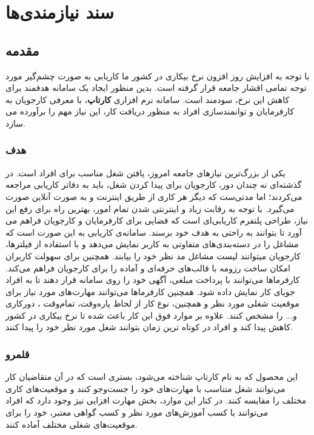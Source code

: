 \documentclass[12pt,svgnames,oneside]{book}
\begin{document}
\renewcommand{\bibname}{مراجع}

\frontmatter
\tableofcontents
\mainmatter

\chapter{سند نیازمندی‌ها}

\section{مقدمه}	
با توجه به افزایش روز افزون نرخ بیکاری در کشور ما کاریابی به صورت چشم‌گیر مورد توجه تمامی اقشار جامعه قرار گرفته است. بدین منظور ایجاد یک سامانه هدفمند برای کاهش این نرخ، سودمند است. سامانه نرم افزاری \textbf{کارتاپ}، با معرفی کارجویان به کارفرمایان و توانمندسازی افراد به منظور دریافت کار، این نیاز مهم را برآورده می سازد.

\subsection{هدف}
یکی از بزرگ‌ترین نیازهای جامعه امروز، یافتن شغل مناسب برای افراد است. در گذشته‌ای نه چندان دور، کارجویان برای پیدا کردن شغل، باید به دفاتر کاریابی مراجعه می‌کردند؛ اما مدتی‌ست که دیگر هر کاری از طریق اینترنت و به صورت آنلاین صورت می‌گیرد. با توجه به رقابت زیاد و اینترنتی شدن تمام امور، بهترین راه برای رفع این نیاز، طراحی پلتفرم کاریابی‌‌ای است که فضایی برای کارفرمایان و کارجویان فراهم می آورد تا بتوانند به راحتی به هدف خود برسند.
سامانه‌ی کاریابی به این صورت است که مشاغل را در دسته‌بندی‌های متفاوتی به کاربر نمایش می‌دهد و با استفاده از فیلترها، کارجویان میتوانند لیست مشاغل مد نظر خود را بیابند. همچنین برای سهولت کاربران امکان ساخت رزومه با قالب‌های حرفه‌ای و آماده را برای کارجویان فراهم می‌کند. کارفرما‌ها می‌توانند با پرداخت مبلغی، آگهی خود را روی سامانه قرار دهند تا به افراد جویای کار نمایش داده شود. همچنین کارفرماها می‌توانند مهارت‌های مورد نیاز برای موقعیت شغلی مورد نظر و همچنین، نوع کار از لحاظ پاره‌وقت، تمام‌وقت ، دورکاری و... را مشخص کنند.				علاوه بر موارد فوق این کار باعث شده تا نرخ بیکاری در کشور کاهش پیدا کند و افراد در کوتاه ترین زمان بتوانند شغل مورد نظر خود را پیدا کنند.

\subsection{قلمرو}			
این محصول که به نام کارتاپ شناخته می‌شود، بستری است که در آن متقاضیان کار می‌توانند شغل متناسب با مهارت‌های خود را جست‌وجو کنند و موقعیت‌های کاری مختلف را مقایسه کنند.
در کنار این موارد، بخش مهارت افزایی نیز وجود دارد که افراد می‌توانند با کسب آموزش‌های مورد نظر و کسب گواهی معتبر، خود را برای موقعیت‌های شغلی مختلف آماده کنند.
\end{document}
